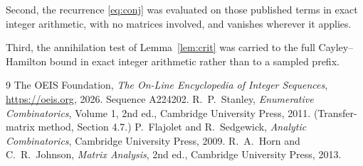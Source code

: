 \documentclass[11pt,a4paper]{article}
\theoremstyle{plain}
\theoremstyle{definition}
\begin{document}
Second, the recurrence \eqref{eq:conj} was evaluated on those published terms in exact
integer arithmetic, with no matrices involved, and vanishes wherever it applies.

Third, the annihilation test of Lemma~\ref{lem:crit} was carried to the full
Cayley--Hamilton bound in exact integer arithmetic rather than to a sampled prefix.

\begin{thebibliography}{9}
 The OEIS Foundation, \emph{The On-Line Encyclopedia of Integer
Sequences}, \url{https://oeis.org}, 2026. Sequence A224202.
 R.~P.~Stanley, \emph{Enumerative Combinatorics}, Volume 1, 2nd ed.,
Cambridge University Press, 2011. (Transfer-matrix method, Section 4.7.)
 P.~Flajolet and R.~Sedgewick, \emph{Analytic Combinatorics}, Cambridge
University Press, 2009.
 R.~A.~Horn and C.~R.~Johnson, \emph{Matrix Analysis}, 2nd ed., Cambridge
University Press, 2013.
\end{thebibliography}
\end{document}

